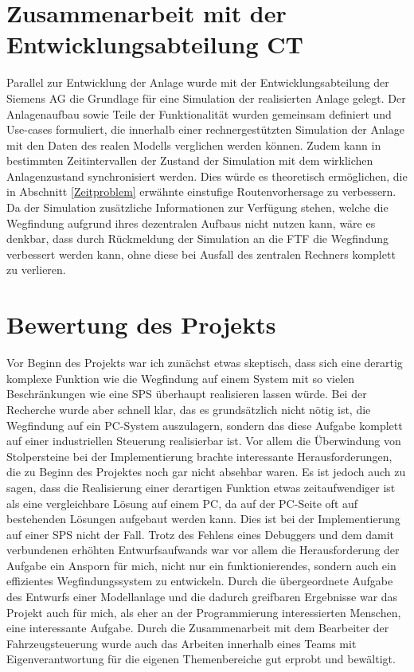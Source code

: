 \section{Zusammenarbeit mit der Entwicklungsabteilung \ac{CT}}

	Parallel zur Entwicklung der Anlage wurde mit der Entwicklungsabteilung der Siemens AG die Grundlage für eine Simulation der realisierten Anlage gelegt. Der Anlagenaufbau sowie Teile der Funktionalität wurden gemeinsam definiert und Use-cases formuliert, die innerhalb einer rechnergestützten Simulation der Anlage mit den Daten des realen Modells verglichen werden können. Zudem kann in bestimmten Zeitintervallen der Zustand der Simulation mit dem wirklichen Anlagenzustand synchronisiert werden. Dies würde es theoretisch ermöglichen, die in Abschnitt \ref{Zeitproblem} erwähnte einstufige Routenvorhersage zu verbessern. Da der Simulation zusätzliche Informationen zur Verfügung stehen, welche die Wegfindung aufgrund ihres dezentralen Aufbaus nicht nutzen kann, wäre es denkbar, dass durch Rückmeldung der Simulation an die \ac{FTF} die Wegfindung verbessert werden kann, ohne diese bei Ausfall des zentralen Rechners komplett zu verlieren.
	
\section{Bewertung des Projekts}
	
	Vor Beginn des Projekts war ich zunächst etwas skeptisch, dass sich eine derartig komplexe Funktion wie die Wegfindung auf einem System mit so vielen Beschränkungen wie eine \ac{SPS} überhaupt realisieren lassen würde. Bei der Recherche wurde aber schnell klar, das es grundsätzlich nicht nötig ist, die Wegfindung auf ein PC-System auszulagern, sondern das diese Aufgabe komplett auf einer industriellen Steuerung realisierbar ist. Vor allem die Überwindung von Stolpersteine bei der Implementierung brachte interessante Herausforderungen, die zu Beginn des Projektes noch gar nicht absehbar waren. Es ist jedoch auch zu sagen, dass die Realisierung einer derartigen Funktion etwas zeitaufwendiger ist als eine vergleichbare Lösung auf einem PC, da auf der PC-Seite oft auf bestehenden Lösungen aufgebaut werden kann. Dies ist bei der Implementierung auf einer \ac{SPS} nicht der Fall. Trotz des Fehlens eines Debuggers und dem damit verbundenen erhöhten Entwurfsaufwands war vor allem die Herausforderung der Aufgabe ein Ansporn für mich, nicht nur ein funktionierendes, sondern auch ein effizientes Wegfindungssystem zu entwickeln. Durch die übergeordnete Aufgabe des Entwurfs einer Modellanlage und die dadurch greifbaren Ergebnisse war das Projekt auch für mich, als eher an der Programmierung interessierten Menschen, eine interessante Aufgabe. Durch die Zusammenarbeit mit dem Bearbeiter der Fahrzeugsteuerung wurde auch das Arbeiten innerhalb eines Teams mit Eigenverantwortung für die eigenen Themenbereiche gut erprobt und bewältigt.

